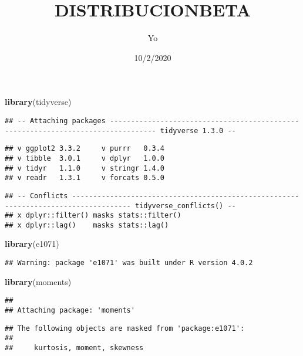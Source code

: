 \documentclass[
]{article}
\title{DISTRIBUCIONBETA}
\author{Yo}
\date{10/2/2020}
\newenvironment{Shaded}{\begin{snugshade}}{\end{snugshade}}
\newcommand{\KeywordTok}[1]{\textcolor[rgb]{0.13,0.29,0.53}{\textbf{#1}}}
\newcommand{\NormalTok}[1]{#1}
\begin{document}
\maketitle

\begin{Shaded}
\begin{Highlighting}[]
\KeywordTok{library}\NormalTok{(tidyverse)}
\end{Highlighting}
\end{Shaded}

\begin{verbatim}
## -- Attaching packages --------------------------------------------------------------------------------- tidyverse 1.3.0 --
\end{verbatim}

\begin{verbatim}
## v ggplot2 3.3.2     v purrr   0.3.4
## v tibble  3.0.1     v dplyr   1.0.0
## v tidyr   1.1.0     v stringr 1.4.0
## v readr   1.3.1     v forcats 0.5.0
\end{verbatim}

\begin{verbatim}
## -- Conflicts ------------------------------------------------------------------------------------ tidyverse_conflicts() --
## x dplyr::filter() masks stats::filter()
## x dplyr::lag()    masks stats::lag()
\end{verbatim}

\begin{Shaded}
\begin{Highlighting}[]
\KeywordTok{library}\NormalTok{(e1071)}
\end{Highlighting}
\end{Shaded}

\begin{verbatim}
## Warning: package 'e1071' was built under R version 4.0.2
\end{verbatim}

\begin{Shaded}
\begin{Highlighting}[]
\KeywordTok{library}\NormalTok{(moments)}
\end{Highlighting}
\end{Shaded}

\begin{verbatim}
## 
## Attaching package: 'moments'
\end{verbatim}

\begin{verbatim}
## The following objects are masked from 'package:e1071':
## 
##     kurtosis, moment, skewness
\end{verbatim}
\end{document}
